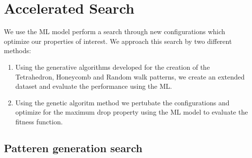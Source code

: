 \section{Accelerated Search}

We use the \acrshort{ML} model perform a search through new configurations which optimize our properties of interest. We approach this search by two different methods:
\begin{enumerate}
  \item Using the generative algorithms developed for the creation of the Tetrahedron, Honeycomb and Random walk patterns, we create an extended dataset and evaluate the performance using the \acrshort{ML}.
  \item Using the genetic algoritm method we pertubate the configurations and optimize for the maximum drop property using the \acrshort{ML} model to evaluate the fitness function. 
\end{enumerate}


\subsection{Patteren generation search}

